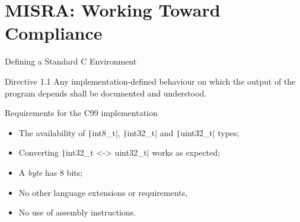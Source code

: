 \documentclass[xcolor={usenames,dvipsnames}]{beamer}
\newcommand{\Inline}[1]{\texttt{#1}}
\newcommand{\InlineC}[1]{\texttt|#1|}
\begin{document}
\section{MISRA: Working Toward Compliance}

\begin{frame}{Defining a Standard C Environment}

  \begin{exampleblock}{Directive 1.1}
    Any implementation-defined behaviour on which the output of the program depends shall be documented and understood.
  \end{exampleblock}






  \pause

  \begin{block}{Requirements for the \alert{C99} implementation}
    \begin{itemize}
      \item The availability of \InlineC{int8_t}, \InlineC{int32_t} and \InlineC{uint32_t} types;
      \item Converting \InlineC{int32_t <-> uint32_t} works as expected;
      \item A \emph{byte} has 8 bits;
      \item No other language extensions or requirements,
      \item No use of assembly instructions.
    \end{itemize}
  \end{block}


\end{frame}
\end{document}
